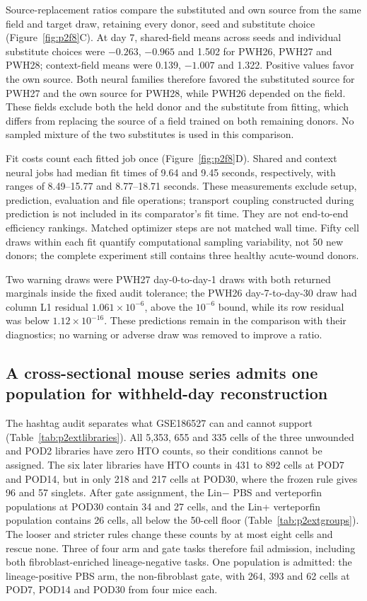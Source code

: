 

Source-replacement ratios compare the substituted and own source from the same field and target draw, retaining every donor, seed and substitute choice (Figure~\ref{fig:p2f8}C). At day 7, shared-field means across seeds and individual substitute choices were $-0.263$, $-0.965$ and 1.502 for PWH26, PWH27 and PWH28; context-field means were 0.139, $-1.007$ and 1.322. Positive values favor the own source. Both neural families therefore favored the substituted source for PWH27 and the own source for PWH28, while PWH26 depended on the field. These fields exclude both the held donor and the substitute from fitting, which differs from replacing the source of a field trained on both remaining donors. No sampled mixture of the two substitutes is used in this comparison.

Fit costs count each fitted job once (Figure~\ref{fig:p2f8}D). Shared and context neural jobs had median fit times of 9.64 and 9.45 seconds, respectively, with ranges of 8.49--15.77 and 8.77--18.71 seconds. These measurements exclude setup, prediction, evaluation and file operations; transport coupling constructed during prediction is not included in its comparator's fit time. They are not end-to-end efficiency rankings. Matched optimizer steps are not matched wall time. Fifty cell draws within each fit quantify computational sampling variability, not 50 new donors; the complete experiment still contains three healthy acute-wound donors.

Two warning draws were PWH27 day-0-to-day-1 draws with both returned marginals inside the fixed audit tolerance; the PWH26 day-7-to-day-30 draw had column L1 residual $1.061\times10^{-6}$, above the $10^{-6}$ bound, while its row residual was below $1.12\times10^{-16}$. These predictions remain in the comparison with their diagnostics; no warning or adverse draw was removed to improve a ratio.

\subsection{A cross-sectional mouse series admits one population for withheld-day reconstruction}

The hashtag audit separates what GSE186527 can and cannot support (Table~\ref{tab:p2extlibraries}). All 5,353, 655 and 335 cells of the three unwounded and POD2 libraries have zero HTO counts, so their conditions cannot be assigned. The six later libraries have HTO counts in 431 to 892 cells at POD7 and POD14, but in only 218 and 217 cells at POD30, where the frozen rule gives 96 and 57 singlets. After gate assignment, the Lin$-$ PBS and verteporfin populations at POD30 contain 34 and 27 cells, and the Lin+ verteporfin population contains 26 cells, all below the 50-cell floor (Table~\ref{tab:p2extgroups}). The looser and stricter rules change these counts by at most eight cells and rescue none. Three of four arm and gate tasks therefore fail admission, including both fibroblast-enriched lineage-negative tasks. One population is admitted: the lineage-positive PBS arm, the non-fibroblast gate, with 264, 393 and 62 cells at POD7, POD14 and POD30 from four mice each.

